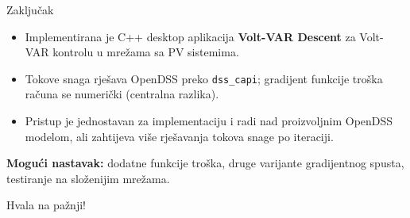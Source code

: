 \documentclass[10pt,aspectratio=169]{beamer}
\begin{document}
\begin{frame}{Zaključak}
  \begin{itemize}
    \item Implementirana je C++ desktop aplikacija \textbf{Volt-VAR Descent} za Volt-VAR kontrolu u mrežama sa PV sistemima.
    \item Tokove snaga rješava OpenDSS preko \texttt{dss\_capi}; gradijent funkcije troška računa se numerički (centralna razlika).
    \item Pristup je jednostavan za implementaciju i radi nad proizvoljnim OpenDSS modelom, ali zahtijeva više rješavanja tokova snage po iteraciji.
  \end{itemize}
  \vspace{0.3em}
  \textbf{Mogući nastavak:} dodatne funkcije troška, druge varijante gradijentnog spusta, testiranje na složenijim mrežama.

\end{frame}

{
\begin{frame}[standout]
  Hvala na pažnji!\\[0.3em]
  \vspace{1em}
\end{frame}
}
\end{document}
